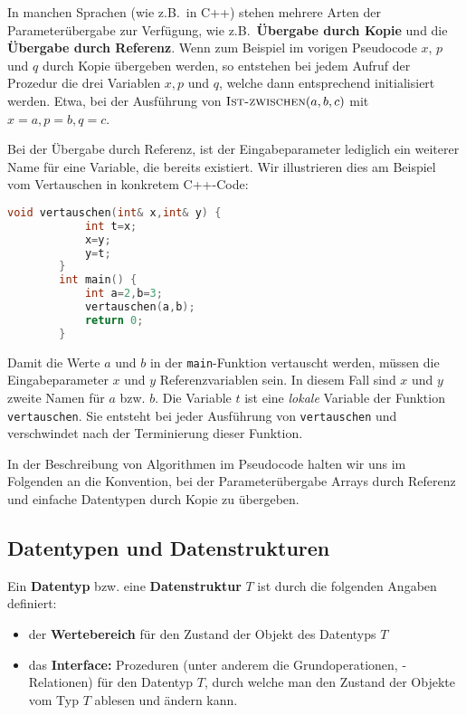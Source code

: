 \begin{bem} 
In manchen Sprachen (wie z.B.~in C++) stehen mehrere Arten der Parameterübergabe zur Verfügung, wie z.B.~\textbf{Übergabe durch Kopie} und die \textbf{Übergabe durch Referenz}. Wenn zum Beispiel im vorigen Pseudocode $x$, $p$ und $q$ durch Kopie übergeben werden, so entstehen bei jedem Aufruf der Prozedur die drei Variablen $x, p$ und $q$, welche dann entsprechend initialisiert werden. Etwa, bei der Ausführung von $\mathop{\text{\textsc{Ist-zwischen}}}(a,b,c)$ mit $x=a, p=b, q=c$. 
\end{bem} 

\begin{bsp} 
Bei der Übergabe durch Referenz, ist der Eingabeparameter lediglich ein weiterer Name für eine Variable, die bereits existiert. Wir illustrieren dies am Beispiel vom Vertauschen in konkretem C++-Code: 

\begin{center}
	\small 
	\begin{lstlisting}[language=C++]
		void vertauschen(int& x,int& y) {
			int t=x;
			x=y;
			y=t;
		}
		int main() {
			int a=2,b=3;
			vertauschen(a,b);
			return 0;
		}
	\end{lstlisting}
\end{center}

Damit die Werte $a$ und $b$ in der \texttt{main}-Funktion vertauscht werden, müssen die Eingabeparameter $x$ und $y$ Referenzvariablen sein. In diesem Fall sind $x$ und $y$ zweite Namen für $a$ bzw. $b$. Die Variable $t$ ist eine \emph{lokale} Variable der Funktion \texttt{vertauschen}. Sie entsteht bei jeder Ausführung von \texttt{vertauschen} und verschwindet nach der Terminierung dieser Funktion. 
\end{bsp} 

\begin{bem}
	In der Beschreibung von Algorithmen im Pseudocode halten wir uns im Folgenden an die Konvention, bei der Parameterübergabe Arrays durch Referenz und einfache Datentypen durch Kopie zu übergeben.
\end{bem}


\subsection{Datentypen und Datenstrukturen}
\label{sect:datenstrukturen}

\begin{defn}
	Ein \textbf{Datentyp} bzw. eine \textbf{Datenstruktur} $T$ ist durch die folgenden Angaben definiert: 
	\begin{itemize} 
		\item[] der \textbf{Wertebereich} für den Zustand der Objekt des Datentyps $T$
		\item[] das \textbf{Interface:} Prozeduren (unter anderem die Grundoperationen, -Relationen) für den Datentyp $T$, durch welche man den Zustand der Objekte vom Typ $T$ ablesen und ändern kann. 
	\end{itemize}  
\end{defn} 


